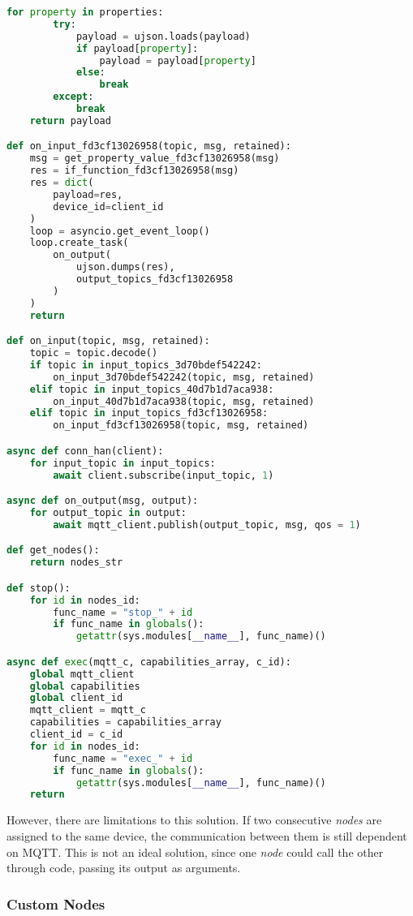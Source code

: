 \begin{lstlisting}[language=Python, caption={Code generated from the flow presented in Figure \ref{fig:code_generation_flow}.}, captionpos=b, label={lst:code_generation}]
    for property in properties:
        try:
            payload = ujson.loads(payload)
            if payload[property]:
                payload = payload[property]
            else:
                break
        except:
            break
    return payload

def on_input_fd3cf13026958(topic, msg, retained):
    msg = get_property_value_fd3cf13026958(msg)
    res = if_function_fd3cf13026958(msg)
    res = dict(
        payload=res,
        device_id=client_id
    )
    loop = asyncio.get_event_loop()
    loop.create_task(
        on_output(
            ujson.dumps(res),
            output_topics_fd3cf13026958
        )
    )
    return

def on_input(topic, msg, retained):
    topic = topic.decode()
    if topic in input_topics_3d70bdef542242:
        on_input_3d70bdef542242(topic, msg, retained)
    elif topic in input_topics_40d7b1d7aca938:
        on_input_40d7b1d7aca938(topic, msg, retained)
    elif topic in input_topics_fd3cf13026958:
        on_input_fd3cf13026958(topic, msg, retained)

async def conn_han(client):
    for input_topic in input_topics:
        await client.subscribe(input_topic, 1)

async def on_output(msg, output):
    for output_topic in output:
        await mqtt_client.publish(output_topic, msg, qos = 1)

def get_nodes():
    return nodes_str

def stop():
    for id in nodes_id:
        func_name = "stop_" + id
        if func_name in globals():
            getattr(sys.modules[__name__], func_name)()

async def exec(mqtt_c, capabilities_array, c_id):
    global mqtt_client
    global capabilities
    global client_id
    mqtt_client = mqtt_c
    capabilities = capabilities_array
    client_id = c_id
    for id in nodes_id:
        func_name = "exec_" + id
        if func_name in globals():
            getattr(sys.modules[__name__], func_name)()
    return
\end{lstlisting}

However, there are limitations to this solution. If two consecutive \textit{nodes} are assigned to the same device, the communication between them is still dependent on MQTT. This is not an ideal solution, since one \textit{node} could call the other through code, passing its output as arguments.

\subsubsection{Custom Nodes}\label{sec:custom_nodes}

